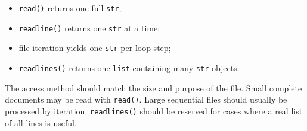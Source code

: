 \begin{itemize}
    \item \texttt{read()} returns one full \texttt{str};
    \item \texttt{readline()} returns one \texttt{str} at a time;
    \item file iteration yields one \texttt{str} per loop step;
    \item \texttt{readlines()} returns one \texttt{list} containing many \texttt{str} objects.
\end{itemize}

The access method should match the size and purpose of the file. Small complete documents may be read with \texttt{read()}. Large sequential files should usually be processed by iteration. \texttt{readlines()} should be reserved for cases where a real list of all lines is useful.

